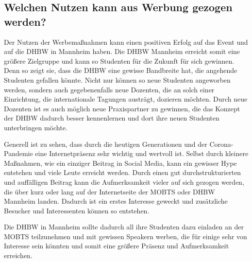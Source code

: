 \subsection{Welchen Nutzen kann aus Werbung gezogen werden?}
Der Nutzen der Werbemaßnahmen kann einen positiven Erfolg auf das Event und auf die DHBW in Mannheim haben. Die DHBW Mannheim erreicht somit eine größere Zielgruppe und kann so Studenten für die Zukunft für sich gewinnen. Denn so zeigt sie, dass die DHBW eine gewisse Bandbreite hat, die angehende Studenten gefallen könnte. Nicht nur können so neue Studenten angeworben werden, sondern auch gegebenenfalls neue Dozenten, die an solch einer Einrichtung, die internationale Tagungen austrägt, dozieren möchten. Durch neue Dozenten ist es auch möglich neue Praxispartner zu gewinnen, die das Konzept der DHBW dadurch besser kennenlernen und dort ihre neuen Studenten unterbringen möchte. 

Generell ist zu sehen, dass durch die heutigen Generationen und der Corona-Pandemie eine Internetpräsenz sehr wichtig und wertvoll ist. Selbst durch kleinere Maßnahmen, wie ein einziger Beitrag in Social Media, kann ein gewisser Hype entstehen und viele Leute erreicht werden. Durch einen gut durchstrukturierten und auffälligen Beitrag kann die Aufmerksamkeit vieler auf sich gezogen werden, die über kurz oder lang auf der Internetseite der MOBTS oder DHBW Mannheim landen. Dadurch ist ein erstes Interesse geweckt und zusätzliche Besucher und Interessenten können so entstehen.

Die DHBW in Mannheim sollte dadurch all ihre Studenten dazu einladen an der MOBTS teilzunehmen und mit gewissen Speakern werben, die für einige sehr von Interesse sein könnten und somit eine größere Präsenz und Aufmerksamkeit erreichen.

